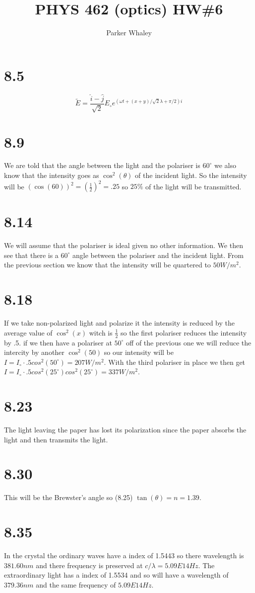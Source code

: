 \documentclass[12pt,a4paper]{article}
\author{Parker Whaley}
\title{PHYS 462 (optics) HW\#6}
\begin{document}
\maketitle
\section{8.5}
$$\tilde{E}=\frac{\hat{i}-\hat{j}}{\sqrt{2}}E_\circ e^{(\omega t+(x+y)/\sqrt{2}\lambda+\pi/2)i}$$
\section{8.9}
We are told that the angle between the light and the polariser is $60^\circ$ we also know that the intensity goes as $\cos^2(\theta)$ of the incident light.  So the intensity will be $(\cos(60))^2=(\frac{1}{2})^2=.25$ so $25\%$ of the light will be transmitted.
\section{8.14}
We will assume that the polariser is ideal given no other information.  We then see that there is a $60^\circ$ angle between the polariser and the incident light.  From the previous section we know that the intensity will be quartered to $50W/m^2$.
\section{8.18}
If we take non-polarized light and polarize it the intensity is reduced by the average value of $\cos^2(x)$ witch is $\frac{1}{2}$ so the first polariser reduces the intensity by .5.  if we then have a polariser at $50^\circ$ off of the previous one we will reduce the intercity by another $\cos^2(50)$ so our intensity will be $I=I_\circ\cdot.5cos^2(50^\circ)=207W/m^2$.  With the third polariser in place we then get $I=I_\circ\cdot.5cos^2(25^\circ)cos^2(25^\circ)=337W/m^2$.
\section{8.23}
The light leaving the paper has lost its polarization since the paper absorbs the light and then transmits the light.
\section{8.30}
This will be the Brewster’s angle so (8.25) $\tan(\theta)=n=1.39$.
\section{8.35}
In the crystal the ordinary waves have a index of 1.5443 so there wavelength is $381.60nm$ and there frequency is preserved at $c/\lambda=5.09E14Hz$.  The extraordinary light has a index of 1.5534 and so will have a wavelength of $379.36nm$ and the same frequency of $5.09E14Hz$.
\end{document}

